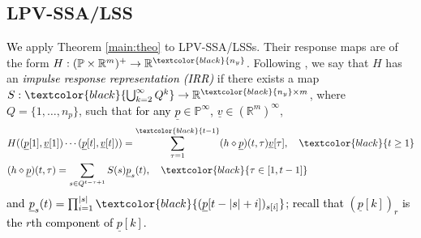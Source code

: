 \documentclass[journal,twoside,web]{ieeecolor}
\newtheorem{Corollary}[Theorem]{Corollary}
\newcommand{\hankredu}{\mathcal{H}_{ \alpha, \beta }}
\newcommand{\Rank}{\mathrm{Rank}}
\begin{document}

\subsection{LPV-SSA/LSS} %
\textcolor{black}{We} apply Theorem \ref{main:theo} to LPV-SSA/LSSs.
Their 
response maps %
are of the form $H: (\mathbb{P} \times \mathbb{R}^m)^+ \to \mathbb{R}^{\textcolor{black}{n_y}}$.
Following \cite{Petreczky2016}, we  say that $H$ has an \textcolor{black}{\emph{impulse response representation (IRR)}} if there exists a map $S: \textcolor{black}{\bigcup_{k=2}^{\infty} Q^{k}} \to \mathbb{R}^{\textcolor{black}{n_y} \times m}$, 
where $Q=\{1,\ldots,n_p\}$, such that 
\textcolor{black}{for any $\underline{p} \in \mathbb{P}^{\infty}$, $\underline{v} \in (\mathbb{R}^m)^{\infty}$}, %
\begin{align*}
 & H((\underline{p}[1], \underline{v}[1])\cdots (\underline{p}[t], \underline{v}[t])) = \sum_{\tau=1}^{\textcolor{black}{t-1}} (h \diamond \underline{p})(t,\tau)\underline{v}[\tau], \quad \textcolor{black}{t \ge 1} \\
   & (h \diamond \underline{p})(t,\tau)=\sum_{s \in Q^{t-\tau+1}} S(s)\underline{p}_s(t), \quad \textcolor{black}{\tau \in [1,t-1]}
\end{align*}
\textcolor{black}{and $\underline{p}_s(t)=\prod_{i=1}^{|s|} \textcolor{black}{(\underline{p}[t-|s|+i])_{s[i]}}$\textcolor{black}{; recall that $(\underline{p}[k])_r$ is the $r$th component of $\underline{p}[k]$}.}
\end{document}
